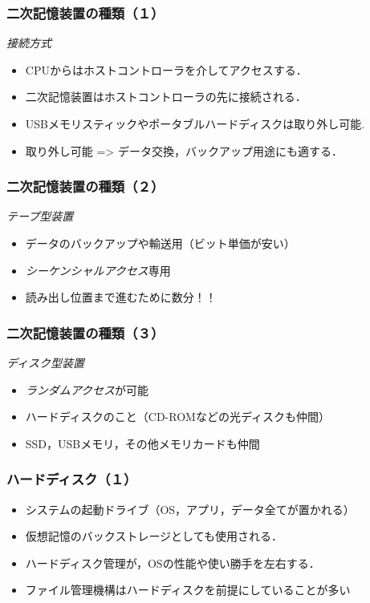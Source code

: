 \documentclass[unicode]{beamer}                   %
\begin{document}
\begin{frame}
  \frametitle{二次記憶装置の種類（１）}
  \emph{接続方式}
  \begin{itemize}
  \item CPUからはホストコントローラを介してアクセスする．
  \item 二次記憶装置はホストコントローラの先に接続される．
  \item USBメモリスティックやポータブルハードディスクは取り外し可能.
  \item 取り外し可能 => データ交換，バックアップ用途にも適する．
  \end{itemize}
\end{frame}

\begin{frame}
  \frametitle{二次記憶装置の種類（２）}
  \emph{テープ型装置}
  \begin{itemize}
  \item データのバックアップや輸送用（ビット単価が安い）
  \item \emph{シーケンシャルアクセス}専用
  \item 読み出し位置まで進むために数分！！
  \end{itemize}
\end{frame}

\begin{frame}
  \frametitle{二次記憶装置の種類（３）}
  \emph{ディスク型装置}
  \begin{itemize}
  \item \emph{ランダムアクセス}が可能
  \item ハードディスクのこと（CD-ROMなどの光ディスクも仲間）
  \item SSD，USBメモリ，その他メモリカードも仲間
  \end{itemize}
\end{frame}

\begin{frame}
  \frametitle{ハードディスク（１）}
  \begin{itemize}
  \item システムの起動ドライブ（OS，アプリ，データ全てが置かれる）
  \item 仮想記憶のバックストレージとしても使用される．
  \item ハードディスク管理が，OSの性能や使い勝手を左右する．
  \item ファイル管理機構はハードディスクを前提にしていることが多い
  \end{itemize}
\end{frame}
\end{document}
